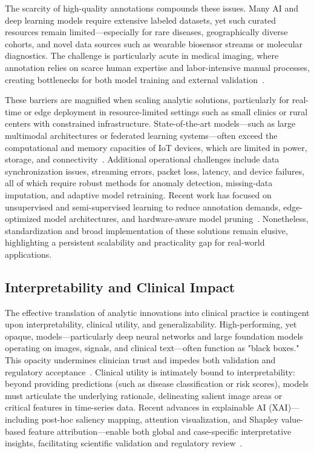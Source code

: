 The scarcity of high-quality annotations compounds these issues. Many AI and deep learning models require extensive labeled datasets, yet such curated resources remain limited—especially for rare diseases, geographically diverse cohorts, and novel data sources such as wearable biosensor streams or molecular diagnostics. The challenge is particularly acute in medical imaging, where annotation relies on scarce human expertise and labor-intensive manual processes, creating bottlenecks for both model training and external validation~\cite{ref54,ref53,ref55,ref65,ref66}.

These barriers are magnified when scaling analytic solutions, particularly for real-time or edge deployment in resource-limited settings such as small clinics or rural centers with constrained infrastructure. State-of-the-art models—such as large multimodal architectures or federated learning systems—often exceed the computational and memory capacities of IoT devices, which are limited in power, storage, and connectivity~\cite{ref16,ref37,ref46,ref54,ref57,ref61,ref70,ref71,ref72,ref73,ref74,ref75,ref76,ref78,ref83,ref90,ref106}. Additional operational challenges include data synchronization issues, streaming errors, packet loss, latency, and device failures, all of which require robust methods for anomaly detection, missing-data imputation, and adaptive model retraining. Recent work has focused on unsupervised and semi-supervised learning to reduce annotation demands, edge-optimized model architectures, and hardware-aware model pruning~\cite{ref28,ref51,ref54,ref56,ref61,ref66,ref72,ref78,ref102}. Nonetheless, standardization and broad implementation of these solutions remain elusive, highlighting a persistent scalability and practicality gap for real-world applications.

\subsection{Interpretability and Clinical Impact}

The effective translation of analytic innovations into clinical practice is contingent upon interpretability, clinical utility, and generalizability. High-performing, yet opaque, models—particularly deep neural networks and large foundation models operating on images, signals, and clinical text—often function as "black boxes." This opacity undermines clinician trust and impedes both validation and regulatory acceptance~\cite{ref11, ref32, ref36, ref39, ref46, ref50, ref53, ref54, ref65, ref68, ref70, ref72, ref73, ref78, ref80, ref87, ref90, ref98, ref99, ref106}. Clinical utility is intimately bound to interpretability: beyond providing predictions (such as disease classification or risk scores), models must articulate the underlying rationale, delineating salient image areas or critical features in time-series data. Recent advances in explainable AI (XAI)—including post-hoc saliency mapping, attention visualization, and Shapley value-based feature attribution—enable both global and case-specific interpretative insights, facilitating scientific validation and regulatory review~\cite{ref11, ref36, ref54, ref72, ref78, ref80, ref98, ref99}.

